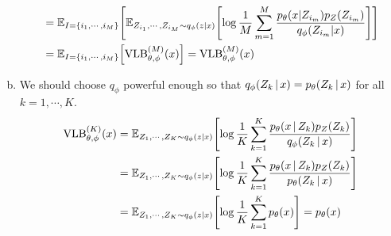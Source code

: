 \documentclass[10pt]{article}
\begin{document}
\begin{enumerate}[(a)]
\begin{align*}
        &= \mathbb{E}_{I = \qty{i_1, \cdots, i_M}}\qty[\mathbb{E}_{Z_{i_1}, \cdots, Z_{i_M} \sim q_\phi(z|x)}\qty[\log\frac{1}{M}\sum_{m=1}^{M}\frac{p_\theta\qty(x|Z_{i_m})p_Z\qty(Z_{i_m})}{q_\phi\qty(Z_{i_m}|x)}]] \\
        &= \mathbb{E}_{I = \qty{i_1, \cdots, i_M}}\qty[\mathrm{VLB}_{\theta, \phi}^{(M)}(x)] = \mathrm{VLB}_{\theta, \phi}^{(M)}(x)
    \end{align*}
    \item We should choose $q_\phi$ powerful enough so that $q_\phi\qty(Z_k \,|\, x) = p_\theta\qty(Z_k \,|\, x)$ for all $k = 1, \cdots, K$.
    \begin{align*}
        \mathrm{VLB}_{\theta, \phi}^{(K)}(x) &= \mathbb{E}_{Z_1, \cdots, Z_K \sim q_\phi(z|x)}\qty[\log\frac{1}{K}\sum_{k=1}^{K}\frac{p_\theta\qty(x \,|\, Z_k)p_Z\qty(Z_k)}{q_\phi\qty(Z_k \,|\, x)}] \\
        &=  \mathbb{E}_{Z_1, \cdots, Z_K \sim q_\phi(z|x)}\qty[\log\frac{1}{K}\sum_{k=1}^{K}\frac{p_\theta\qty(x \,|\, Z_k)p_Z\qty(Z_k)}{p_\theta\qty(Z_k \,|\, x)}] \\
        &=  \mathbb{E}_{Z_1, \cdots, Z_K \sim q_\phi(z|x)}\qty[\log\frac{1}{K}\sum_{k=1}^{K}p_\theta(x)] = p_\theta(x)
    \end{align*}
\end{enumerate}
\end{document}
